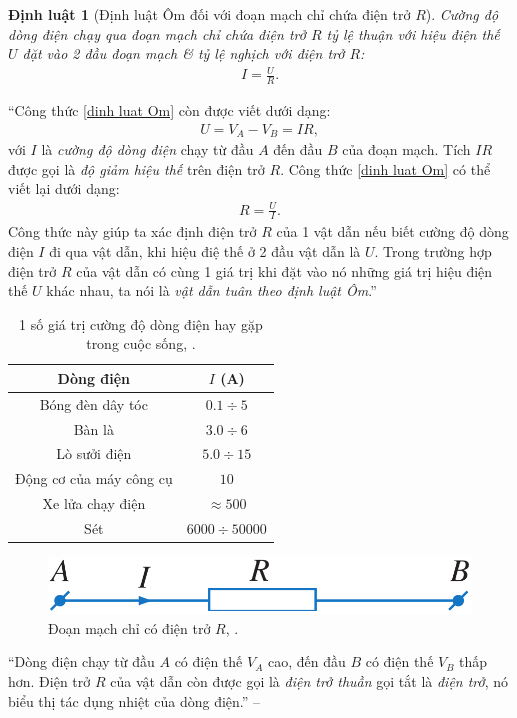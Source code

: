 \documentclass[oneside]{book}
\numberwithin{equation}{section}
\newtheorem{dinhluat}{Định luật}[section]
\begin{document}
\begin{dinhluat}[Định luật Ôm đối với đoạn mạch chỉ chứa điện trở $R$]
	Cường độ dòng điện chạy qua đoạn mạch chỉ chứa điện trở $R$ tỷ lệ thuận với hiệu điện thế $U$ đặt vào 2 đầu đoạn mạch \& tỷ lệ nghịch với điện trở $R$:
	\begin{align}
		\label{dinh luat Om}
		I = \frac{U}{R}.
		\end{align}
\end{dinhluat}
``Công thức \eqref{dinh luat Om} còn được viết dưới dạng:
\begin{align}
	\label{dinh luat Om 1}
	U = V_A - V_B = IR,
\end{align}
với $I$ là \textit{cường độ dòng điện} chạy từ đầu $A$ đến đầu $B$ của đoạn mạch. Tích $IR$ được gọi là \textit{độ giảm hiệu thế} trên điện trở $R$. Công thức \eqref{dinh luat Om} có thể viết lại dưới dạng:
\begin{align}
	\label{dinh luat Om 2}
	R = \frac{U}{I}.
\end{align}
Công thức này giúp ta xác định điện trở $R$ của 1 vật dẫn nếu biết cường độ dòng điện $I$ đi qua vật dẫn, khi hiệu điệ thế ở 2 đầu vật dẫn là $U$. Trong trường hợp điện trở $R$ của vật dẫn có cùng 1 giá trị khi đặt vào nó những giá trị hiệu điện thế $U$ khác nhau, ta nói là \textit{vật dẫn tuân theo định luật Ôm}.''

\begin{table}[H]
	\centering
	\begin{tabular}{|c|c|}
		\hline
		\textbf{Dòng điện} & $I$ (A) \\
		\hline
		Bóng đèn dây tóc & $0.1\div 5$ \\
		\hline
		Bàn là & $3.0\div 6$ \\
		\hline
		Lò sưởi điện & $5.0\div 15$ \\
		\hline
		Động cơ của máy công cụ & $10$ \\
		\hline
		Xe lửa chạy điện & $\approx 500$ \\
		\hline
		Sét & $6000\div 50000$ \\
		\hline
	\end{tabular}
	\caption{1 số giá trị cường độ dòng điện hay gặp trong cuộc sống, \cite[Bảng 10.1, p. 49]{SGK_Vat_Ly_11_nang_cao}.}
\end{table}

\begin{figure}[H]
	\centering
	\includegraphics[scale=0.15]{doan_mach_chi_co_dien_tro}
	\caption{Đoạn mạch chỉ có điện trở $R$, \cite[Hình 10.1, p. 49]{SGK_Vat_Ly_11_nang_cao}.}
	\label{fig:doan_mach_chi_co_dien_tro}
\end{figure}
``Dòng điện chạy từ đầu $A$ có điện thế $V_A$ cao, đến đầu $B$ có điện thế $V_B$ thấp hơn. Điện trở $R$ của vật dẫn còn được gọi là \textit{điện trở thuần} gọi tắt là \textit{điện trở}, nó biểu thị tác dụng nhiệt của dòng điện.'' -- \cite[p. 49]{SGK_Vat_Ly_11_nang_cao}
\end{document}
